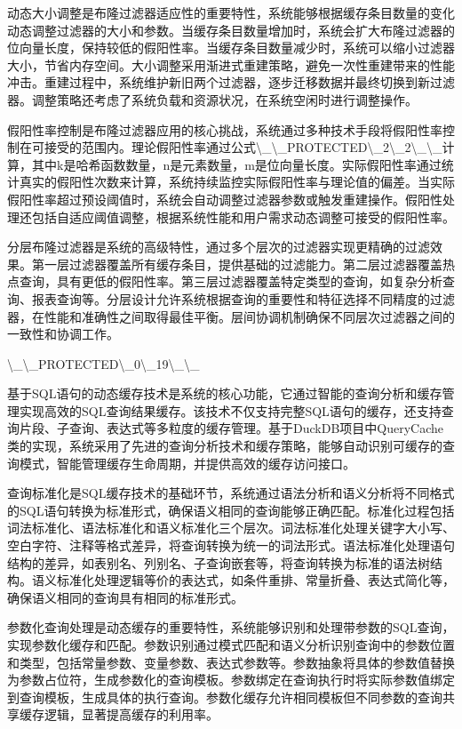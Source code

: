 动态大小调整是布隆过滤器适应性的重要特性，系统能够根据缓存条目数量的变化动态调整过滤器的大小和参数。当缓存条目数量增加时，系统会扩大布隆过滤器的位向量长度，保持较低的假阳性率。当缓存条目数量减少时，系统可以缩小过滤器大小，节省内存空间。大小调整采用渐进式重建策略，避免一次性重建带来的性能冲击。重建过程中，系统维护新旧两个过滤器，逐步迁移数据并最终切换到新过滤器。调整策略还考虑了系统负载和资源状况，在系统空闲时进行调整操作。

假阳性率控制是布隆过滤器应用的核心挑战，系统通过多种技术手段将假阳性率控制在可接受的范围内。理论假阳性率通过公式\textbackslash{}_\textbackslash{}_PROTECTED\textbackslash{}_2\textbackslash{}_2\textbackslash{}_\textbackslash{}_计算，其中k是哈希函数数量，n是元素数量，m是位向量长度。实际假阳性率通过统计真实的假阳性次数来计算，系统持续监控实际假阳性率与理论值的偏差。当实际假阳性率超过预设阈值时，系统会自动调整过滤器参数或触发重建操作。假阳性处理还包括自适应阈值调整，根据系统性能和用户需求动态调整可接受的假阳性率。

分层布隆过滤器是系统的高级特性，通过多个层次的过滤器实现更精确的过滤效果。第一层过滤器覆盖所有缓存条目，提供基础的过滤能力。第二层过滤器覆盖热点查询，具有更低的假阳性率。第三层过滤器覆盖特定类型的查询，如复杂分析查询、报表查询等。分层设计允许系统根据查询的重要性和特征选择不同精度的过滤器，在性能和准确性之间取得最佳平衡。层间协调机制确保不同层次过滤器之间的一致性和协调工作。

\textbackslash{}_\textbackslash{}_PROTECTED\textbackslash{}_0\textbackslash{}_19\textbackslash{}_\textbackslash{}_

基于SQL语句的动态缓存技术是系统的核心功能，它通过智能的查询分析和缓存管理实现高效的SQL查询结果缓存。该技术不仅支持完整SQL语句的缓存，还支持查询片段、子查询、表达式等多粒度的缓存管理。基于DuckDB项目中QueryCache类的实现，系统采用了先进的查询分析技术和缓存策略，能够自动识别可缓存的查询模式，智能管理缓存生命周期，并提供高效的缓存访问接口。

查询标准化是SQL缓存技术的基础环节，系统通过语法分析和语义分析将不同格式的SQL语句转换为标准形式，确保语义相同的查询能够正确匹配。标准化过程包括词法标准化、语法标准化和语义标准化三个层次。词法标准化处理关键字大小写、空白字符、注释等格式差异，将查询转换为统一的词法形式。语法标准化处理语句结构的差异，如表别名、列别名、子查询嵌套等，将查询转换为标准的语法树结构。语义标准化处理逻辑等价的表达式，如条件重排、常量折叠、表达式简化等，确保语义相同的查询具有相同的标准形式。

参数化查询处理是动态缓存的重要特性，系统能够识别和处理带参数的SQL查询，实现参数化缓存和匹配。参数识别通过模式匹配和语义分析识别查询中的参数位置和类型，包括常量参数、变量参数、表达式参数等。参数抽象将具体的参数值替换为参数占位符，生成参数化的查询模板。参数绑定在查询执行时将实际参数值绑定到查询模板，生成具体的执行查询。参数化缓存允许相同模板但不同参数的查询共享缓存逻辑，显著提高缓存的利用率。

